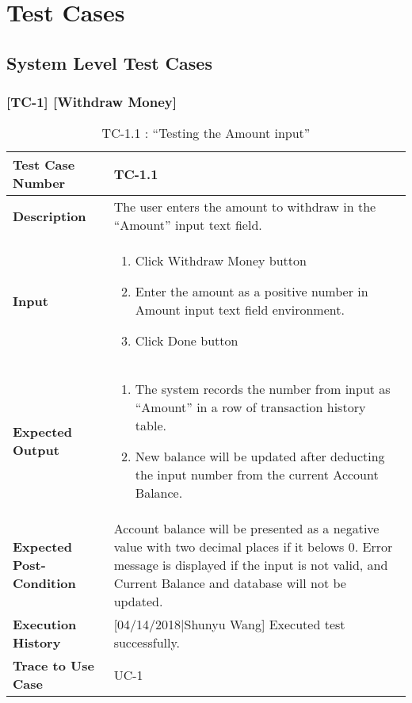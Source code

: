 \documentclass[12pt]{article}
\begin{document}
\section{Test Cases}

\subsection{System Level Test Cases}

\subsubsection{[TC-1] [Withdraw Money]} \label{tc:1}
\begin{table}[H]
\caption{ TC-1.1 : “Testing the Amount input”}
\begin{center}
\begin{tabular}{|p{5.5	cm}|p{11cm}|}
\hline
\bf Test Case Number & 
TC-1.1 \\
\hline
\bf Description & 
The user enters the amount to withdraw in the “Amount” input text field.\\
\hline
\bf Input & 
\begin{enumerate}
  \item Click Withdraw Money button
  \item Enter the amount as a positive number in Amount input text field environment.
  \item Click Done button
\end{enumerate} \\
\hline
\bf Expected Output & 
\begin{enumerate}
  \item The system records the number from input as “Amount” in a row of transaction history table.
  \item New balance will be updated after deducting the input number from the current Account Balance.
\end{enumerate} \\
\hline
\bf Expected Post-Condition & 
Account balance will be presented as a negative value with two decimal places if it belows 0. Error message is displayed if the input is not valid, 
and Current Balance and database will not be updated.\\
\hline
\bf Execution History & 
[04/14/2018|Shunyu Wang] Executed test successfully.\\
\hline
\bf Trace to Use Case & 
UC-1\\
\hline

\end{tabular}
\end{center}
\end{table}
\end{document}
